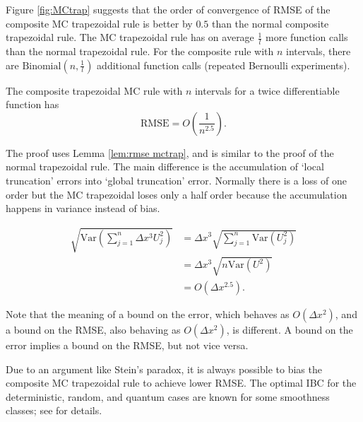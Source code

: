 \documentclass[a4paper,12pt]{article}
\begin{document}
Figure \ref{fig:MCtrap} suggests that the order of convergence of RMSE of the
composite MC trapezoidal rule is better by $0.5$ than the normal composite trapezoidal rule.
The MC trapezoidal rule has on average $\frac{1}{l}$ more function calls than
the normal trapezoidal rule. For the composite rule with $n$ intervals,
there are $\text{Binomial}(n,\frac{1}{l})$ additional function calls
(repeated Bernoulli experiments).\\

\begin{theorem} \label{thrm:order trap}
    The composite trapezoidal MC rule  with $n$ intervals
    for a twice differentiable function has
    \begin{equation}
        \text{RMSE} =O\left(\frac{1}{n^{2.5}} \right) .
    \end{equation}
\end{theorem}

The proof uses Lemma \ref{lem:rmse mctrap},
and is similar to the proof of the normal
trapezoidal rule. The main difference is the
accumulation of \enquote*{local truncation} errors into \enquote*{global truncation} error.
Normally there is a loss of one order but the MC trapezoidal loses only a half order
because the accumulation happens in variance instead of bias.

\begin{align}
    \sqrt{\text{Var}\left(\sum_{j=1}^{n}  \Delta x^{3}U_{j}^{2}\right)}
     & = \Delta x^{3} \sqrt{ \sum_{j=1}^{n}\text{Var} (U_{j}^{2})} \\
     & = \Delta x^{3} \sqrt{ n \text{Var}(U^{2})}                  \\
     & = O( \Delta x^{2.5}).
\end{align}

Note that the meaning of a bound on the error, which behaves as $O(\Delta x^{2})$,
and a bound on the RMSE, also behaving as $O(\Delta x^{2})$, is different.
A bound on the error implies a bound on the RMSE, but not vice versa.

\begin{related}
    Due to an argument like Stein's paradox,
    it is always possible to bias the composite MC trapezoidal
    rule to achieve lower RMSE.
    The optimal IBC for the deterministic, random, and quantum cases are known
    for some smoothness classes; see \cite{heinrich_optimal_2001} for details.
\end{related}
\end{document}
